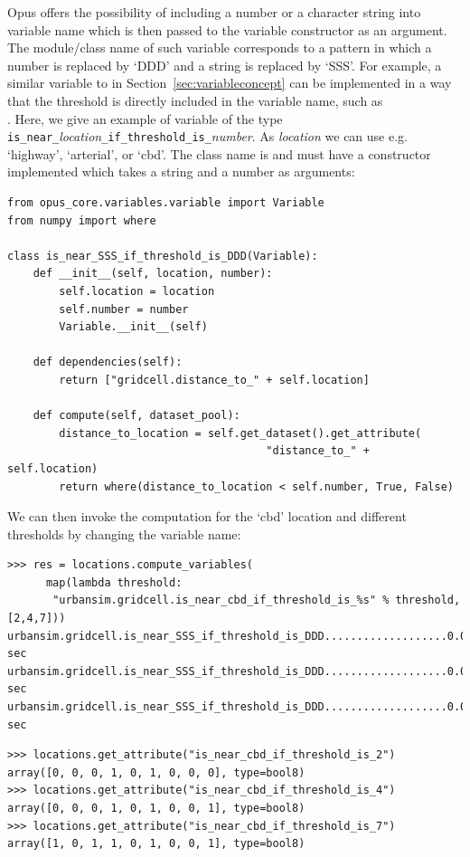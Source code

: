 Opus offers the possibility of including a number or a character string into
variable name which is then passed to the variable constructor as an argument.
The module/class name of such variable corresponds to a pattern in which a
number is replaced by `DDD' and a string is replaced by `SSS'\@.  For example,
a similar variable to  in Section~\ref{sec:variableconcept} can be
implemented in a way that the threshold is directly included in the variable
name, such as \\
. Here, we give an example of variable
of the type \verb|is_near_|{\em location}\verb|_if_threshold_is_|{\em number}.
As {\em location} we can use e.g. `highway',  `arterial', or `cbd'.
The class name is  and must have a
constructor implemented which takes a string and a number as arguments:

\variablesindex
\numpyindex
\begin{verbatim}
from opus_core.variables.variable import Variable
from numpy import where

class is_near_SSS_if_threshold_is_DDD(Variable):
    def __init__(self, location, number):
        self.location = location
        self.number = number
        Variable.__init__(self)

    def dependencies(self):
        return ["gridcell.distance_to_" + self.location]

    def compute(self, dataset_pool):
        distance_to_location = self.get_dataset().get_attribute(
                                        "distance_to_" + self.location)
        return where(distance_to_location < self.number, True, False)
\end{verbatim}
We can then invoke the computation for the `cbd' location and different
thresholds by changing the variable name:
\begin{verbatim}
>>> res = locations.compute_variables(
      map(lambda threshold:
       "urbansim.gridcell.is_near_cbd_if_threshold_is_%s" % threshold, [2,4,7]))
urbansim.gridcell.is_near_SSS_if_threshold_is_DDD...................0.0 sec
urbansim.gridcell.is_near_SSS_if_threshold_is_DDD...................0.0 sec
urbansim.gridcell.is_near_SSS_if_threshold_is_DDD...................0.0 sec
\end{verbatim}

\attributesindex
\begin{verbatim}
>>> locations.get_attribute("is_near_cbd_if_threshold_is_2")
array([0, 0, 0, 1, 0, 1, 0, 0, 0], type=bool8)
>>> locations.get_attribute("is_near_cbd_if_threshold_is_4")
array([0, 0, 0, 1, 0, 1, 0, 0, 1], type=bool8)
>>> locations.get_attribute("is_near_cbd_if_threshold_is_7")
array([1, 0, 1, 1, 0, 1, 0, 0, 1], type=bool8)
\end{verbatim}

